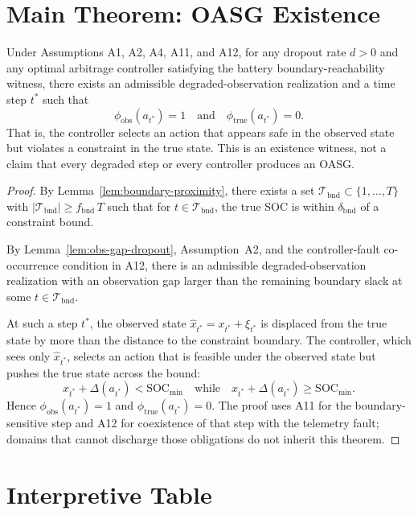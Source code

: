 \section{Main Theorem: OASG Existence}

\begin{theorem}
\label{thm:oasg-existence}
Under Assumptions A1, A2, A4, A11, and A12, for any dropout rate $d > 0$ and
any optimal arbitrage controller satisfying the battery boundary-reachability
witness, there exists an admissible degraded-observation realization and a time
step $t^*$ such that
\[
  \phi_{\text{obs}}(a_{t^*}) = 1 \quad\text{and}\quad
  \phi_{\text{true}}(a_{t^*}) = 0.
\]
That is, the controller selects an action that appears safe in the
observed state but violates a constraint in the true state.  This is an
existence witness, not a claim that every degraded step or every controller
produces an OASG.
\end{theorem}

\begin{proof}
By Lemma~\ref{lem:boundary-proximity}, there exists a set
$\mathcal{T}_{\text{bnd}} \subset \{1, \ldots, T\}$ with
$|\mathcal{T}_{\text{bnd}}| \ge f_{\text{bnd}}\,T$ such that for
$t \in \mathcal{T}_{\text{bnd}}$, the true SOC is within
$\delta_{\text{bnd}}$ of a constraint bound.

By Lemma~\ref{lem:obs-gap-dropout}, Assumption~A2, and the controller-fault
co-occurrence condition in A12, there is an admissible degraded-observation
realization with an observation gap larger than the remaining boundary slack at
some $t\in\mathcal{T}_{\text{bnd}}$.

At such a step $t^*$, the observed state $\hat{x}_{t^*} = x_{t^*} + \xi_{t^*}$
is displaced from the true state by more than the distance to the
constraint boundary.  The controller, which sees only $\hat{x}_{t^*}$,
selects an action that is feasible under the observed state but pushes
the true state across the bound:
\[
  x_{t^*} + \Delta(a_{t^*}) < \text{SOC}_{\min}
  \quad\text{while}\quad
  \hat{x}_{t^*} + \Delta(a_{t^*}) \ge \text{SOC}_{\min}.
\]
Hence $\phi_{\text{obs}}(a_{t^*}) = 1$ and $\phi_{\text{true}}(a_{t^*}) = 0$.
The proof uses A11 for the boundary-sensitive step and A12 for coexistence of
that step with the telemetry fault; domains that cannot discharge those
obligations do not inherit this theorem.
\end{proof}

\section{Interpretive Table}

